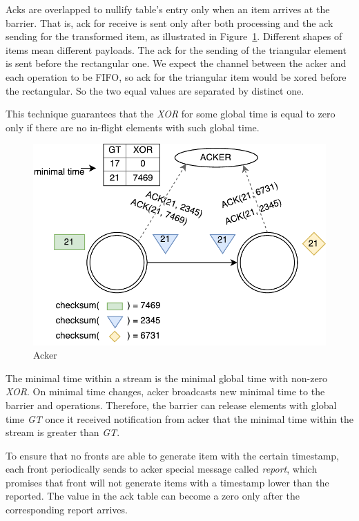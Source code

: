 Acks are overlapped to nullify table's entry only when an item arrives at the barrier. That is, ack for receive is sent only after both processing and the ack sending for the transformed item, as illustrated in Figure~\ref{acker}. Different shapes of items mean different payloads. The ack for the sending of the triangular element is sent before the rectangular one. We expect the channel between the acker and each operation to be FIFO, so ack for the triangular item would be xored before the rectangular. So the two equal values are separated by distinct one. 

This technique guarantees that the {\it XOR} for some global time is equal to zero only if there are no in-flight elements with such global time.

\begin{figure}[htbp]
  \centering
  \includegraphics[scale=0.6]{pics/acker}
  \caption{Acker}
  \label {acker}
\end{figure}

The minimal time within a stream is the minimal global time with non-zero {\it XOR}. On minimal time changes, acker broadcasts new minimal time to the barrier and operations. Therefore, the barrier can release elements with global time {\it GT} once it received notification from acker that the minimal time within the stream is greater than {\it GT}.

To ensure that no fronts are able to generate item with the certain timestamp, each front periodically sends to acker special message called {\it report}, which promises that front will not generate items with a timestamp lower than the reported. The value in the ack table can become a zero only after the corresponding report arrives.

